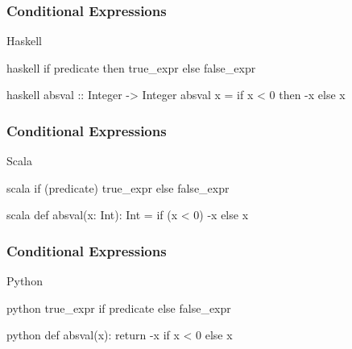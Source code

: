 \documentclass[dvipsnames]{beamer}
\theoremstyle{plain}
\begin{document}
\begin{frame}[fragile]
  \frametitle{Conditional Expressions}

  \begin{block}{Haskell}
    \begin{pygments}{haskell}
if predicate then true_expr else false_expr
    \end{pygments}
  \end{block}

  \pause
  \medskip
  \begin{example}[Haskell]
    \begin{pygments}{haskell}
absval :: Integer -> Integer
absval x = if x < 0 then -x else x
    \end{pygments}
  \end{example}
\end{frame}

\begin{frame}[fragile]
  \frametitle{Conditional Expressions}

  \begin{block}{Scala}
    \begin{pygments}{scala}
if (predicate) true_expr else false_expr
    \end{pygments}
  \end{block}

  \pause
  \medskip
  \begin{example}[Scala]
    \begin{pygments}{scala}
def absval(x: Int): Int =
    if (x < 0) -x else x
    \end{pygments}
  \end{example}
\end{frame}

\begin{frame}[fragile]
  \frametitle{Conditional Expressions}

  \begin{block}{Python}
    \begin{pygments}{python}
true_expr if predicate else false_expr
    \end{pygments}
  \end{block}

  \pause
  \medskip
  \begin{example}[Python]
    \begin{pygments}{python}
def absval(x):
    return -x if x < 0 else x
    \end{pygments}
  \end{example}
\end{frame}
\end{document}
